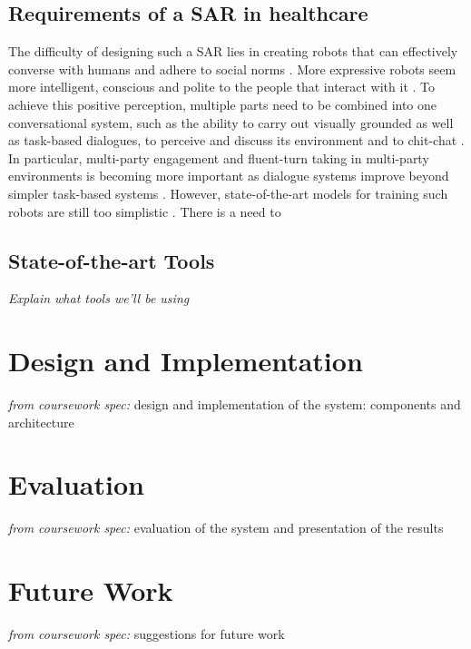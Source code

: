 \documentclass[11pt]{article}
\begin{document}
\subsection{Requirements of a SAR in healthcare}
\label{subsec:SAR_requirements}
The difficulty of designing such a SAR lies in creating robots that can effectively converse with humans and adhere to social norms \cite{moujahid_multi_party_2022}. More expressive robots seem more intelligent, conscious and polite to the people that interact with it \cite{moujahid_multi_party_2022}. To achieve this positive perception, multiple parts need to be combined into one conversational system, such as the ability to carry out visually grounded as well as task-based dialogues, to perceive and discuss its environment and to chit-chat \cite{gunson_visually_aware_2022}. In particular, multi-party engagement and fluent-turn taking in multi-party environments is becoming more important as dialogue systems improve beyond simpler task-based systems \cite{skantze_turn_taking_2021}. However, state-of-the-art models for training such robots are still too simplistic \cite{skantze_turn_taking_2021}. There is a need to 

\subsection{State-of-the-art Tools}
\label{subsec:tools}
\textit{Explain what tools we'll be using}


\section{Design and Implementation}
\label{sec:implementation}

\textit{from coursework spec:} design and implementation of the system: components and architecture


\section{Evaluation}
\label{sec:evaluation}

\textit{from coursework spec:} evaluation of the system and presentation of the results


\section{Future Work}
\label{sec:future_work}

\textit{from coursework spec:} suggestions for future work
\end{document}
